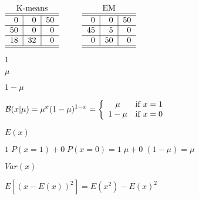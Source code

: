 \documentclass{article}
\def\lthtmlcheckvsize{\ifdim\ht\sizebox<\vsize 
  \ifdim\wd\sizebox<\hsize\expandafter\hfill\fi \expandafter\vfill
  \else\expandafter\vss\fi}%
\begin{document}
{\newpage\clearpage
{}%
$\displaystyle \begin{tabular}{r|r|r}
\multicolumn{3}{c}{K-means}\\\hline\hline
0 & 0 & 50\\\hline 50 & 0 & 0\\\hline18 & 32 & 0\\\hline\hline
\end{tabular}
\;\;\;\;\;\;\;\;\;\;
\begin{tabular}{r|r|r}
\multicolumn{3}{c}{EM}\\\hline\hline
0 & 0 & 50\\\hline45 & 5 & 0\\\hline0 & 50 & 0\\\hline\hline
\end{tabular}$%
\lthtmlindisplaymathZ
\lthtmlcheckvsize\clearpage}

{\newpage\clearpage
{}%
$ 1$%
\lthtmlindisplaymathZ
\lthtmlcheckvsize\clearpage}

{\newpage\clearpage
{}%
$ \mu$%
\lthtmlindisplaymathZ
\lthtmlcheckvsize\clearpage}

{\newpage\clearpage
{}%
$ 1-\mu$%
\lthtmlindisplaymathZ
\lthtmlcheckvsize\clearpage}

{\newpage\clearpage
{}%
$\displaystyle {\cal B}(x|\mu)=\mu^x(1-\mu)^{1-x}=\left\{\begin{array}{cl}
\mu & \mbox{if $x=1$} \\1-\mu & \mbox{if $x=0$} \end{array}\right.$%
\lthtmlindisplaymathZ
\lthtmlcheckvsize\clearpage}

{\newpage\clearpage
{}%
$\displaystyle E(x)$%
\lthtmlindisplaymathZ
\lthtmlcheckvsize\clearpage}

{\newpage\clearpage
{}%
$\displaystyle 1\;P(x=1)+0\;P(x=0)=1\;\mu+0\;(1-\mu)=\mu$%
\lthtmlindisplaymathZ
\lthtmlcheckvsize\clearpage}

{\newpage\clearpage
{}%
$\displaystyle Var(x)$%
\lthtmlindisplaymathZ
\lthtmlcheckvsize\clearpage}

{\newpage\clearpage
{}%
$\displaystyle E[(x-E(x))^2]=E(x^2)-E(x)^2$%
\lthtmlindisplaymathZ
\lthtmlcheckvsize\clearpage}
\end{document}

